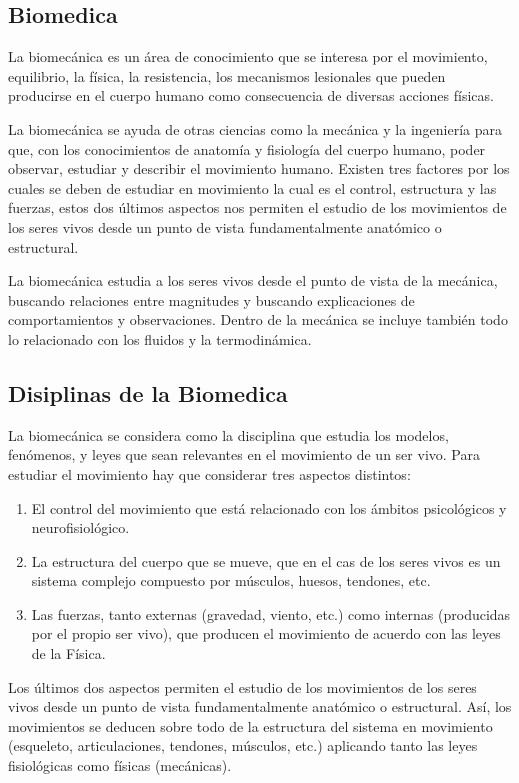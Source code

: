 \documentclass{article}
\begin{document}
\subsection{Biomedica}

La biomecánica es un área de conocimiento que se interesa por el movimiento, equilibrio, la física, la resistencia, los mecanismos lesionales que pueden producirse en el cuerpo humano como consecuencia de diversas acciones físicas.

La biomecánica se ayuda de otras ciencias como la mecánica y la ingeniería para que, con los conocimientos de anatomía y fisiología del cuerpo humano, poder observar, estudiar y describir el movimiento humano. Existen tres factores por los cuales se deben de estudiar en movimiento la cual es el control, estructura y las fuerzas, estos dos últimos aspectos nos permiten el estudio de los movimientos de los seres vivos desde un punto de vista fundamentalmente anatómico o estructural.\cite{ff4}

La biomecánica estudia a los seres vivos desde el punto de vista de la mecánica, buscando relaciones entre magnitudes y buscando explicaciones de comportamientos y observaciones. Dentro de la mecánica se incluye también todo lo relacionado con los fluidos y la termodinámica. 


\subsection{Disiplinas de la Biomedica}

La biomecánica se considera como la disciplina que estudia los modelos, fenómenos, y leyes que sean relevantes en el movimiento de un ser vivo. Para estudiar el movimiento hay que considerar tres aspectos distintos: 
\begin{enumerate} 
\item El control del movimiento que está relacionado con los ámbitos psicológicos y neurofisiológico.
\item La estructura del cuerpo que se mueve, que en el cas de los seres vivos es un sistema complejo compuesto por músculos, huesos, tendones, etc. 
\item Las fuerzas, tanto externas (gravedad, viento, etc.) como internas (producidas por el propio ser vivo), que producen el movimiento de acuerdo con las leyes de la Física. 
\end{enumerate} 
Los últimos dos aspectos permiten el estudio de los movimientos de los seres vivos desde un punto de vista fundamentalmente anatómico o estructural. Así, los movimientos se deducen sobre todo de la estructura del sistema en movimiento (esqueleto, articulaciones, tendones, músculos, etc.) aplicando tanto las leyes fisiológicas como físicas (mecánicas). \cite{ff5}
\end{document}
